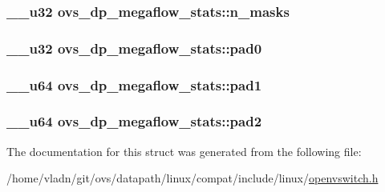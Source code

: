 \subsubsection[{n\+\_\+masks}]{\setlength{\rightskip}{0pt plus 5cm}\+\_\+\+\_\+u32 ovs\+\_\+dp\+\_\+megaflow\+\_\+stats\+::n\+\_\+masks}\label{structovs__dp__megaflow__stats_a7984504a5c12cc5a0767c6a34c4c9c96}
\hypertarget{structovs__dp__megaflow__stats_a958a20791b4e74e2be231c1b82dd9268}{}
\subsubsection[{pad0}]{\setlength{\rightskip}{0pt plus 5cm}\+\_\+\+\_\+u32 ovs\+\_\+dp\+\_\+megaflow\+\_\+stats\+::pad0}\label{structovs__dp__megaflow__stats_a958a20791b4e74e2be231c1b82dd9268}
\hypertarget{structovs__dp__megaflow__stats_a2cd7b88cd84316721a2dfafc7040b99a}{}
\subsubsection[{pad1}]{\setlength{\rightskip}{0pt plus 5cm}\+\_\+\+\_\+u64 ovs\+\_\+dp\+\_\+megaflow\+\_\+stats\+::pad1}\label{structovs__dp__megaflow__stats_a2cd7b88cd84316721a2dfafc7040b99a}
\hypertarget{structovs__dp__megaflow__stats_a321ac1dbc76c153d6dd969ad929dea75}{}
\subsubsection[{pad2}]{\setlength{\rightskip}{0pt plus 5cm}\+\_\+\+\_\+u64 ovs\+\_\+dp\+\_\+megaflow\+\_\+stats\+::pad2}\label{structovs__dp__megaflow__stats_a321ac1dbc76c153d6dd969ad929dea75}


The documentation for this struct was generated from the following file\+:\begin{DoxyCompactItemize}
\item 
/home/vladn/git/ovs/datapath/linux/compat/include/linux/\hyperlink{openvswitch_8h}{openvswitch.\+h}\end{DoxyCompactItemize}
